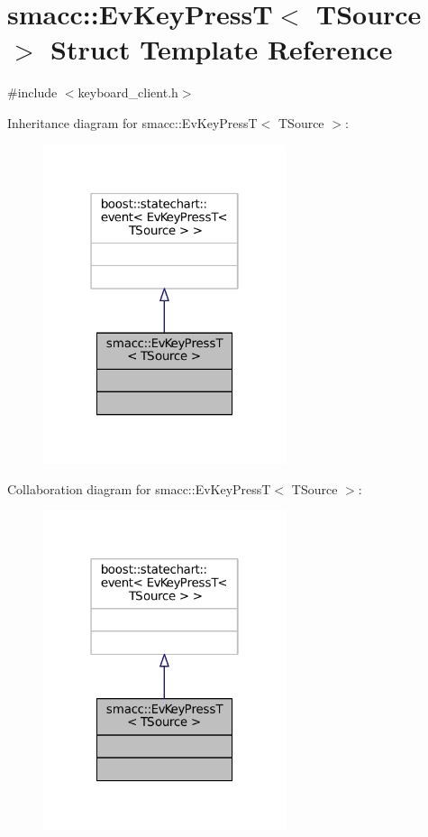 \hypertarget{structsmacc_1_1EvKeyPressT}{}\section{smacc\+:\+:Ev\+Key\+PressT$<$ T\+Source $>$ Struct Template Reference}
\label{structsmacc_1_1EvKeyPressT}


{\ttfamily \#include $<$keyboard\+\_\+client.\+h$>$}



Inheritance diagram for smacc\+:\+:Ev\+Key\+PressT$<$ T\+Source $>$\+:
\nopagebreak
\begin{figure}[H]
\begin{center}
\leavevmode
\includegraphics[width=202pt]{structsmacc_1_1EvKeyPressT__inherit__graph}
\end{center}
\end{figure}


Collaboration diagram for smacc\+:\+:Ev\+Key\+PressT$<$ T\+Source $>$\+:
\nopagebreak
\begin{figure}[H]
\begin{center}
\leavevmode
\includegraphics[width=202pt]{structsmacc_1_1EvKeyPressT__coll__graph}
\end{center}
\end{figure}


